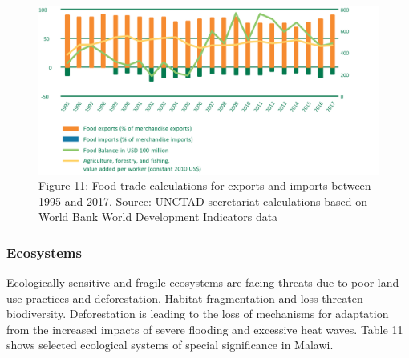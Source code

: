 \documentclass[
]{book}
\begin{document}
\begin{figure}
\centering
\includegraphics{images/food_trade.png}
\caption{Figure 11: Food trade calculations for exports and imports between 1995 and 2017. Source: UNCTAD secretariat calculations based on World Bank World Development Indicators data}
\end{figure}

\hypertarget{ecosystems}{%
\subsubsection{Ecosystems}\label{ecosystems}}

Ecologically sensitive and fragile ecosystems are facing threats due to poor land use practices and deforestation. Habitat fragmentation and loss threaten biodiversity. Deforestation is leading to the loss of mechanisms for adaptation from the increased impacts of severe flooding and excessive heat waves. Table 11 shows selected ecological systems of special significance in Malawi.

\providecommand{\docline}[3]{\noalign{\global\setlength{\arrayrulewidth}{#1}}\arrayrulecolor[HTML]{#2}\cline{#3}}

\setlength{\tabcolsep}{2pt}

\renewcommand*{\arraystretch}{1.5}
\end{document}
